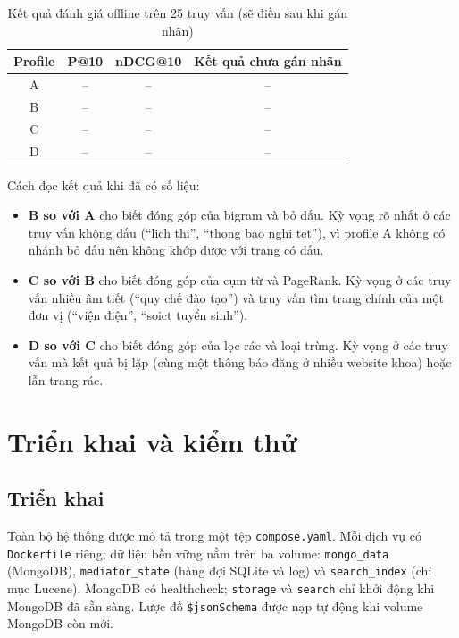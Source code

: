 \documentclass[12pt,a4paper]{report}
\begin{document}
\begin{table}[ht]
\centering
\caption{Kết quả đánh giá offline trên 25 truy vấn (sẽ điền sau khi gán nhãn)}\label{tab:eval}
\begin{tabular}{c c c c}
\toprule
Profile & P@10 & nDCG@10 & Kết quả chưa gán nhãn \\
\midrule
A & -- & -- & -- \\
B & -- & -- & -- \\
C & -- & -- & -- \\
D & -- & -- & -- \\
\bottomrule
\end{tabular}
\end{table}

Cách đọc kết quả khi đã có số liệu:
\begin{itemize}
  \item \textbf{B so với A} cho biết đóng góp của bigram và bỏ dấu. Kỳ vọng rõ nhất ở các truy vấn không dấu
        (``lich thi'', ``thong bao nghi tet''), vì profile A không có nhánh bỏ dấu nên không khớp được với trang có dấu.
  \item \textbf{C so với B} cho biết đóng góp của cụm từ và PageRank. Kỳ vọng ở các truy vấn nhiều âm tiết (``quy chế
        đào tạo'') và truy vấn tìm trang chính của một đơn vị (``viện điện'', ``soict tuyển sinh'').
  \item \textbf{D so với C} cho biết đóng góp của lọc rác và loại trùng. Kỳ vọng ở các truy vấn mà kết quả bị lặp (cùng
        một thông báo đăng ở nhiều website khoa) hoặc lẫn trang rác.
\end{itemize}

\chapter{Triển khai và kiểm thử}\label{ch:ops}

\section{Triển khai}

Toàn bộ hệ thống được mô tả trong một tệp \texttt{compose.yaml}. Mỗi dịch vụ có \texttt{Dockerfile} riêng; dữ liệu bền
vững nằm trên ba volume: \texttt{mongo\_\allowbreak{}data} (MongoDB), \texttt{mediator\_\allowbreak{}state} (hàng đợi SQLite và log) và
\texttt{search\_\allowbreak{}index} (chỉ mục Lucene). MongoDB có healthcheck; \texttt{storage} và \texttt{search} chỉ khởi động khi
MongoDB đã sẵn sàng. Lược đồ \texttt{\$jsonSchema} được nạp tự động khi volume MongoDB còn mới.
\end{document}
